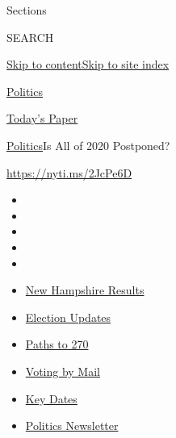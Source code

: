 Sections

SEARCH

\protect\hyperlink{site-content}{Skip to
content}\protect\hyperlink{site-index}{Skip to site index}

\href{https://www.nytimes3xbfgragh.onion/section/politics}{Politics}

\href{https://myaccount.nytimes3xbfgragh.onion/auth/login?response_type=cookie\&client_id=vi}{}

\href{https://www.nytimes3xbfgragh.onion/section/todayspaper}{Today's
Paper}

\href{/section/politics}{Politics}\textbar{}Is All of 2020 Postponed?

\url{https://nyti.ms/2JcPe6D}

\begin{itemize}
\item
\item
\item
\item
\item
\end{itemize}

\begin{itemize}
\item
  \href{https://www.nytimes3xbfgragh.onion/interactive/2020/09/08/us/elections/results-new-hampshire-primary-elections.html?action=click\&pgtype=Article\&state=default\&region=TOP_BANNER\&context=storylines_menu}{New
  Hampshire Results}
\item
  \href{https://www.nytimes3xbfgragh.onion/live/2020/09/08/us/trump-vs-biden?action=click\&pgtype=Article\&state=default\&region=TOP_BANNER\&context=storylines_menu}{Election
  Updates}
\item
  \href{https://www.nytimes3xbfgragh.onion/interactive/2020/us/elections/election-states-biden-trump.html?action=click\&pgtype=Article\&state=default\&region=TOP_BANNER\&context=storylines_menu}{Paths
  to 270}
\item
  \href{https://www.nytimes3xbfgragh.onion/interactive/2020/08/31/us/politics/vote-by-mail-deadlines.html?action=click\&pgtype=Article\&state=default\&region=TOP_BANNER\&context=storylines_menu}{Voting
  by Mail}
\item
  \href{https://www.nytimes3xbfgragh.onion/interactive/2019/us/elections/2020-presidential-election-calendar.html?action=click\&pgtype=Article\&state=default\&region=TOP_BANNER\&context=storylines_menu}{Key
  Dates}
\item
  \href{https://www.nytimes3xbfgragh.onion/newsletters/politics?action=click\&pgtype=Article\&state=default\&region=TOP_BANNER\&context=storylines_menu}{Politics
  Newsletter}
\end{itemize}

